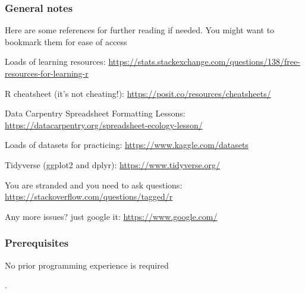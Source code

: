 \documentclass[
]{article}
\begin{document}
\hypertarget{general-notes}{%
\subsubsection{General notes}\label{general-notes}}

Here are some references for further reading if needed. You might want
to bookmark them for ease of access

Loads of learning resources:
\url{https://stats.stackexchange.com/questions/138/free-resources-for-learning-r}

R cheatsheet (it's not cheating!):
\url{https://posit.co/resources/cheatsheets/}

Data Carpentry Spreadsheet Formatting Lessons:
\url{https://datacarpentry.org/spreadsheet-ecology-lesson/}

Loads of datasets for practicing: \url{https://www.kaggle.com/datasets}

Tidyverse (ggplot2 and dplyr): \url{https://www.tidyverse.org/}

You are stranded and you need to ask questions:
\url{https://stackoverflow.com/questions/tagged/r}

Any more issues? just google it: \url{https://www.google.com/}

\hypertarget{prerequisites}{%
\subsubsection{Prerequisites}\label{prerequisites}}

No prior programming experience is required

.
\end{document}
